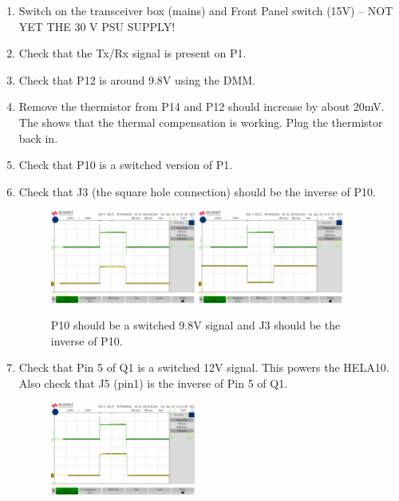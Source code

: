 \begin{enumerate}
	\item Switch on the transceiver box (mains) and Front Panel switch (15V) – NOT YET THE 30 V PSU SUPPLY!
	\item Check that the Tx/Rx signal is present on P1.
	\item Check that P12 is around 9.8V using the DMM.
	\item Remove the thermistor from P14 and P12 should increase by about 20mV. The shows that the thermal compensation is working. Plug the thermistor back in.
	\item Check that P10 is a switched version of P1.
	\item Check that J3 (the square hole connection) should be the inverse of P10.
		\begin{figure}[H]
			\centering
			\includegraphics[width=0.45\textwidth]{images/hardware/signal_13.jpg}
			\includegraphics[width=0.45\textwidth]{images/hardware/signal_14.jpg}
			\caption{P10 should be a switched 9.8V signal and J3 should be the inverse of P10.}
			\label{fig:hw_amp_signals_1}
		\end{figure}
	\item Check that Pin 5 of Q1 is a switched 12V signal. This powers the HELA10. Also check that J5 (pin1) is the inverse of Pin 5 of Q1.
		\begin{figure}[H]
			\centering
			\includegraphics[width=0.45\textwidth]{images/hardware/signal_15.jpg}

\end{figure}
\end{enumerate}
